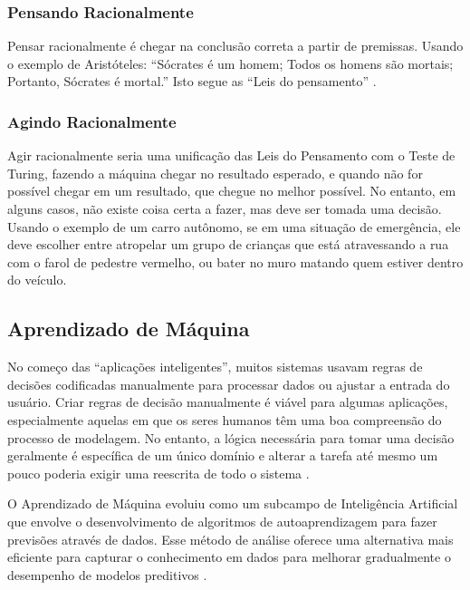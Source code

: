 \documentclass[
	12pt,				%
	openright,			%
	oneside,			%
	a4paper,			%
	english,			%
	spanish,			%
	brazil				%
	]{abntex2}
\begin{document}
	\subsubsection*{Pensando Racionalmente}
		Pensar racionalmente é chegar na conclusão correta a partir de premissas. Usando o exemplo de Aristóteles: ``Sócrates é um homem; Todos os homens são mortais; Portanto, Sócrates é mortal.''  Isto segue as ``Leis do pensamento''  \cite{laws_of_thought}.
		
	\subsubsection*{Agindo Racionalmente}
		Agir racionalmente seria uma unificação das Leis do Pensamento com o Teste de Turing, fazendo a máquina chegar no resultado esperado, e quando não for possível chegar em um resultado, que chegue no melhor possível. No entanto, em alguns casos, não existe coisa certa a fazer, mas deve ser tomada uma decisão. Usando o exemplo de um carro autônomo, se em uma situação de emergência, ele deve escolher entre atropelar um grupo de crianças que está atravessando a rua com o farol de pedestre vermelho, ou bater no muro matando quem estiver dentro do veículo.
	
	\subsection{Aprendizado de Máquina}
		No começo das ``aplicações inteligentes'', muitos sistemas usavam regras de decisões codificadas manualmente para processar dados ou ajustar a entrada do usuário. Criar regras de decisão manualmente é viável para algumas aplicações, especialmente aquelas em que os seres humanos têm uma boa compreensão do processo de modelagem. No entanto, a lógica necessária para tomar uma decisão geralmente é específica de um único domínio e alterar a tarefa até mesmo um pouco poderia exigir uma reescrita de todo o sistema \cite {guido_muller}.

		O Aprendizado de Máquina evoluiu como um subcampo de Inteligência Artificial que envolve o desenvolvimento de algoritmos de autoaprendizagem para fazer previsões através de dados. Esse método de análise oferece uma alternativa mais eficiente para capturar o conhecimento em dados para melhorar gradualmente o desempenho de modelos preditivos \cite{ r_julian_heart}.
\end{document}
